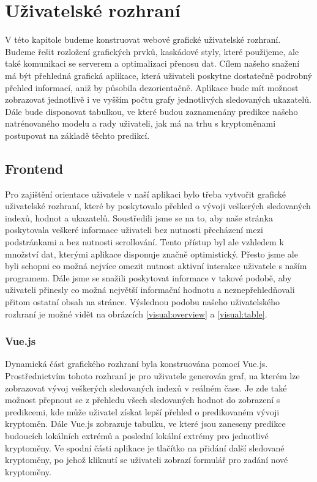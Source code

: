 \chapter{Uživatelské rozhraní}

V této kapitole budeme konstruovat webové grafické uživatelské rozhraní. 
Budeme řešit rozložení grafických prvků, kaskádové styly, které použijeme, ale také komunikaci se serverem a optimalizaci přenosu dat.
Cílem našeho snažení má být přehledná grafická aplikace, která uživateli poskytne dostatečně podrobný přehled informací, aniž by působila dezorientačně.
Aplikace bude mít možnost zobrazovat jednotlivě i ve vyšším počtu grafy jednotlivých sledovaných ukazatelů.
Dále bude disponovat tabulkou, ve které budou zaznamenány predikce našeho natrénovaného modelu a rady uživateli, jak má na trhu s kryptoměnami postupovat na základě těchto predikcí.

\section{Frontend}

Pro zajištění orientace uživatele v naší aplikaci bylo třeba vytvořit grafické uživatelské rozhraní, které by poskytovalo přehled o vývoji veškerých sledovaných indexů, hodnot a ukazatelů. 
Soustředili jsme se na to, aby naše stránka poskytovala veškeré informace uživateli bez nutnosti přecházení mezi podstránkami a bez nutnosti scrollování. 
Tento přístup byl ale vzhledem k množství dat, kterými aplikace disponuje značně optimistický. 
Přesto jsme ale byli schopni co možná nejvíce omezit nutnost aktivní interakce uživatele s naším programem. 
Dále jsme se snažili poskytovat informace v takové podobě, aby uživateli přinesly co možná největší informační hodnotu a neznepřehledňovali přitom ostatní obsah na stránce. 
Výslednou podobu našeho uživatelského rozhraní je možné vidět na obrázcích \ref{visual:overview} a \ref{visual:table}.

\subsection{Vue.js}

Dynamická část grafického rozhraní byla konstruována pomocí Vue.js. 
Prostřednictvím tohoto rozhraní je pro uživatele generován graf, na kterém lze zobrazovat vývoj veškerých sledovaných indexů v reálném čase. 
Je zde také možnost přepnout se z přehledu všech sledovaných hodnot do zobrazení s predikcemi, kde může uživatel získat lepší přehled o predikovaném vývoji kryptoměn.
Dále Vue.js zobrazuje tabulku, ve které jsou zaneseny predikce budoucích lokálních extrémů a poslední lokální extrémy pro jednotlivé kryptoměny. 
Ve spodní části aplikace je tlačítko na přidání další sledované kryptoměny, po jehož kliknutí se uživateli zobrazí formulář pro zadání nové kryptoměny.

